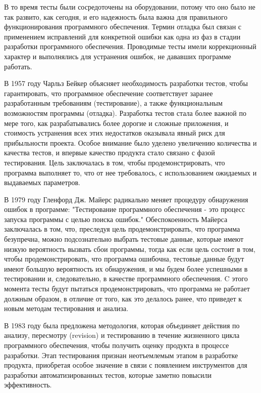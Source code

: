 В то время тесты были сосредоточены на оборудовании, потому что оно было не так развито, как 
сегодня, и его надежность была важна для правильного функционирования программного обеспечения.
Термин отладка был связан с применением исправлений для конкретной ошибки как одна из фаз в 
стадии разработки программного обеспечения. Проводимые тесты имели коррекционный характер и 
выполнялись для устранения ошибок, не дававших программе работать. 

В 1957 году Чарльз Бейкер объясняет необходимость разработки тестов, чтобы гарантировать, что 
программное обеспечение соответствует заранее разработанным требованиям (тестирование), а также 
функциональным возможностям программы (отладка)\cite{Baker}. Разработка тестов стала более важной по мере 
того, как разрабатывались более дорогие и сложные приложения, и стоимость устранения всех этих 
недостатков оказывала явный риск для прибыльности проекта. Особое внимание было уделено 
увеличению количества и качества тестов, и впервые качество продукта стало связано с фазой 
тестирования. Цель заключалась в том, чтобы продемонстрировать, что программа выполняет то, что 
от нее требовалось, с использованием ожидаемых и выдаваемых параметров.

В 1979 году Гленфорд Дж. Майерс радикально меняет процедуру обнаружения ошибок в программе:
"Тестирование программного обеспечения - это процесс запуска программы с целью поиска ошибок."\cite{Myers1979}
Обеспокоенность Майерса заключалась в том, что, преследуя цель продемонстрировать, что программа 
безупречна, можно подсознательно выбрать тестовые данные, которые имеют низкую вероятность 
вызвать сбои программы, тогда как если цель состоит в том, чтобы продемонстрировать, что 
программа ошибочна, тестовые данные будут имеют большую вероятность их обнаружения, и мы будем 
более успешными в тестировании и, следовательно, в качестве программного обеспечения. C этого
момента тесты будут пытаться продемонстрировать, что программа не работает должным образом, в 
отличие от того, как это делалось ранее, что приведет к новым методам тестирования и анализа.

В 1983 году была предложена методология, которая объединяет действия по анализу, пересмотру 
(revision) и тестированию в течение жизненного цикла программного обеспечения, чтобы получить 
оценку продукта в процессе разработки. Этап тестирования признан неотъемлемым этапом в 
разработке продукта, приобретая особое значение в связи с появлением инструментов для разработки 
автоматизированных тестов, которые заметно повысили эффективность.

